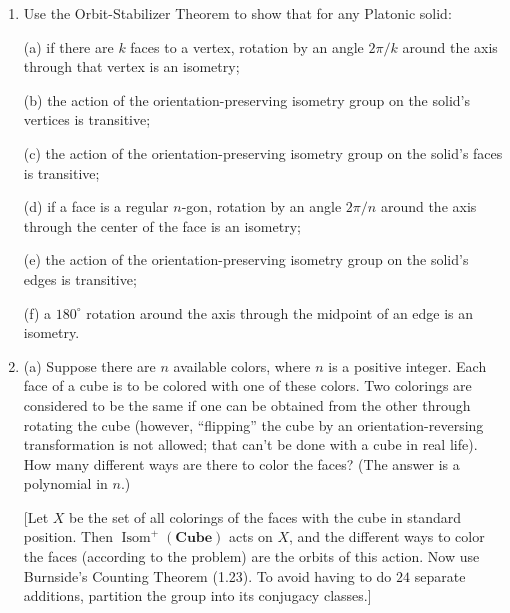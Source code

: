 \documentclass[leqno]{book}
\begin{document}
\begin{enumerate}
(f) The action then induces a homomorphism $\varphi:\operatorname{Isom}^+(\mathbf{Icos})\to S(X)$.  Show that $\varphi$ is injective.  [The kernel of $\varphi$ is a normal subgroup of $\operatorname{Isom}^+(\mathbf{Icos})$ contained in $\operatorname{Isom}^+(\mathbf{Tet})$.]

(g) Use part (f) to show $\operatorname{Isom}^+(\mathbf{Icos})\cong A_5$.  [Use Exercise 13(h) of Section 1.6.]

(h) Now show that $\operatorname{Isom}(\mathbf{Icos})\cong A_5\times\mathbb Z/2\mathbb Z$.

\item Use the Orbit-Stabilizer Theorem to show that for any Platonic solid:

(a) if there are $k$ faces to a vertex, rotation by an angle $2\pi/k$ around the axis through that vertex is an isometry;

(b) the action of the orientation-preserving isometry group on the solid's vertices is transitive;

(c) the action of the orientation-preserving isometry group on the solid's faces is transitive;

(d) if a face is a regular $n$-gon, rotation by an angle $2\pi/n$ around the axis through the center of the face is an isometry;

(e) the action of the orientation-preserving isometry group on the solid's edges is transitive;

(f) a $180^\circ$ rotation around the axis through the midpoint of an edge is an isometry.

\item (a) Suppose there are $n$ available colors, where $n$ is a positive integer.  Each face of a cube is to be colored with one of these colors.  Two colorings are considered to be the same if one can be obtained from the other through rotating the cube (however, ``flipping'' the cube by an orientation-reversing transformation is not allowed; that can't be done with a cube in real life).  How many different ways are there to color the faces?  (The answer is a polynomial in $n$.)

[Let $X$ be the set of all colorings of the faces with the cube in standard position.  Then $\operatorname{Isom}^+(\mathbf{Cube})$ acts on $X$, and the different ways to color the faces (according to the problem) are the orbits of this action.  Now use Burnside's Counting Theorem (1.23).  To avoid having to do $24$ separate additions, partition the group into its conjugacy classes.]


\end{enumerate}
\end{document}
